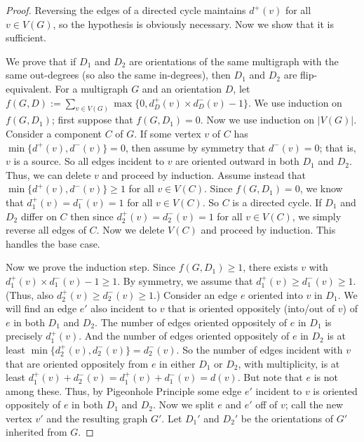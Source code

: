 \documentclass[a4paper,12pt]{article}
\theoremstyle{plain}
\theoremstyle{definition}
\renewcommand\ge\geqslant
\begin{document}
\begin{proof}
	Reversing the edges of a directed cycle maintains $d^+(v)$ for all $v\in V(G)$, so the
	hypothesis is obviously necessary.  Now we show that it is sufficient.

	We prove that if $D_1$ and $D_2$ are orientations of the same multigraph with the same out-degrees (so also the same in-degrees), then $D_1$ and $D_2$ are flip-equivalent.
	For a multigraph $G$ and an orientation $D$, let 
	$f(G,D):= \sum_{v\in V(G)}\max\{0,d_D^+(v)\times d_D^-(v)-1\}$.
	We use induction on $f(G,D_1)$; 
    first suppose that $f(G,D_1)=0$.
	Now we use induction on $|V(G)|$.
	Consider a component $C$ of $G$. If some vertex $v$ of $C$ has $\min\{d^+(v),d^-(v)\}=0$,
	then assume by symmetry that $d^-(v)=0$; that is, $v$ is a source.
	So all edges incident to $v$ are oriented outward in both $D_1$ and $D_2$. Thus, we can delete $v$ and proceed by induction. Assume instead that $\min\{d^+(v),d^-(v)\}\ge 1$ for all $v\in V(C)$. Since $f(G,D_1)=0$, we know that $d_{1}^+(v)=d_{1}^-(v)=1$ for all $v\in V(C)$.
	So $C$ is a directed cycle. If $D_1$ and $D_2$ differ on $C$ then since $d_2^+(v)=d_2^-(v)=1$ for all $v\in V(C)$, we simply reverse all edges of $C$. Now we delete $V(C)$ and proceed by induction.  This handles the base case.

	Now we prove the induction step. Since $f(G,D_1)\ge 1$, there exists $v$ with $d^+_1(v)\times d^-_1(v)-1 \ge 1$. By symmetry, we assume that $d_1^+(v)\ge d_1^-(v)\ge 1$. (Thus, also $d_2^+(v)\ge d_2^-(v)\ge 1$.) Consider an edge $e$ oriented into $v$ in $D_1$. We will find an edge $e'$ also incident to $v$ that is oriented 
	oppositely (into/out of $v$) of $e$ in both $D_1$ and $D_2$.  The number of edges
	oriented oppositely of $e$ in $D_1$ is precisely $d_1^+(v)$. And the number of edges oriented oppositely of $e$ in $D_2$ is at least $\min\{d_2^+(v),d_2^-(v)\} = d_2^-(v)$. So the number of edges incident with $v$ that are oriented oppositely from $e$ in either $D_1$ or $D_2$, with multiplicity, is at least $d_1^+(v)+d_2^-(v) = d_1^+(v)+d_1^-(v)=d(v)$. But note that $e$ is not
    among these. Thus, by Pigeonhole Principle some edge $e'$ incident to $v$ is oriented oppositely of $e$ in both $D_1$ and $D_2$.
	Now we split $e$ and $e'$ off of $v$; call the new vertex $v'$ and the resulting graph $G'$. Let $D_1'$ and $D_2'$ be the orientations of $G'$ inherited from $G$.  


\end{proof}
\end{document}
